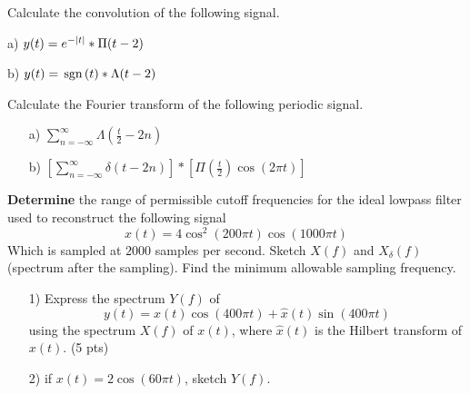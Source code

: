 \documentclass{assignment}
\begin{document}
\begin{prob}[10 pts]
    Calculate the convolution of the following signal.
    \item[a)] $y(t)=e^{-\left\lvert t\right\rvert}*\Pi(t-2)$
    \item[b)] $y(t)=\,\text{sgn}\,(t)*\Lambda(t-2)$
\end{prob}
\begin{sol}

\end{sol}

\begin{prob}[20 pts]
    Calculate the Fourier transform of the following periodic signal.
    \begin{itemize}
        \item[a)] $\sum_{n=-\infty}^{\infty}\Lambda(\frac{t}{2}-2n)$
        \item[b)] $\left[\sum_{n=-\infty}^{\infty}\delta(t-2n)\right]*\left[\Pi(\frac{t}{2})\cos(2\pi t)\right]$
    \end{itemize}
\end{prob}
\begin{sol}

\end{sol}

\begin{prob}[15 pts]
    \textbf{Determine} the range of permissible cutoff frequencies for the ideal lowpass filter used to reconstruct the following signal
    \[
        x(t)=4\cos^2(200\pi t)\cos(1000\pi t)
    \]
    Which is sampled at $2000$ samples per second. Sketch $X(f)$ and $X_{\delta}(f)$ (spectrum after the sampling). Find the minimum allowable sampling frequency.
\end{prob}
\begin{sol}

\end{sol}

\begin{prob}
    \begin{itemize}
        \item[1)] Express the spectrum $Y(f)$ of
        \[
            y(t)=x(t)\cos(400\pi t)+\hat{x}(t)\sin(400\pi t)
        \]
        using the spectrum $X(f)$ of $x(t)$, where $\hat{x}(t)$ is the Hilbert transform of $x(t)$. (5 pts)
        \item[2)] if $x(t)=2\cos(60\pi t)$, sketch $Y(f).$
    \end{itemize}
\end{prob}
\begin{sol}

\end{sol}
\end{document}
